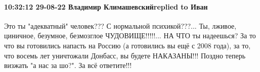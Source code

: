  
 
 
 
 

\paragraph{10:32:12 29-08-22 Владимир Климашевскийreplied to Иван}

Это ты "адекватный" человек??? С нормальной психикой???...
Ты, лживое, циничное, безумное, безмозглое ЧУДОВИЩЕ!!!!!... НА ЧТО ты надеешься? За то что вы готовились напасть на Россию (а готовились вы ещё с 2008 года), за то, что восемь лет уничтожали Донбасс, вы будете НАКАЗАНЫ!!! Поздно теперь визжать "а нас за шо?". За всё ответите!!!
